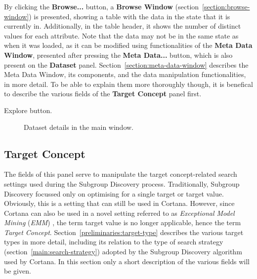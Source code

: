 \documentclass{article}
\begin{document}
By clicking the {\bf Browse...} button, a {\bf Browse Window} (section~\ref{section:browse-window}) is presented, showing a table with the data in the state that it is currently in.
Additionally, in the table header, it shows the number of distinct values for each attribute.
Note that the data may not be in the same state as when it was loaded, as it can be modified using functionalities of the {\bf Meta Data Window}, presented after pressing the {\bf Meta Data...} button, which is also present on the {\bf Dataset} panel.
Section~\ref{section:meta-data-window} describes the Meta Data Window, its components, and the data manipulation functionalities, in more detail.
To be able to explain them more thoroughly though, it is benefical to describe the various fields of the {\bf Target Concept} panel first.

Explore button.

\begin{figure}
\begin{center}
\centering
{}
\caption{Dataset details in the main window.}
\end{center}
\label{fig:dataset}
\end{figure}





\subsection{Target Concept}
\label{main:target-concept}
The fields of this panel serve to manipulate the target concept-related search settings used during the Subgroup Discovery process.
Traditionally, Subgroup Discovery focussed only on optimising for a single target or target value.
Obviously, this is a setting that can still be used in Cortana.
However, since Cortana can also be used in a novel setting referred to as \emph{Exceptional Model Mining} (\emph{EMM}) \cite{emm}, the term target value is no longer applicable, hence the term \emph{Target Concept}.
Section~\ref{preliminaries:target-type} describes the various target types in more detail, including its relation to the type of search strategy (section~\ref{main:search-strategy}) adopted by the Subgroup Discovery algorithm used by Cortana.
In this section only a short description of the various fields will be given.
\end{document}
